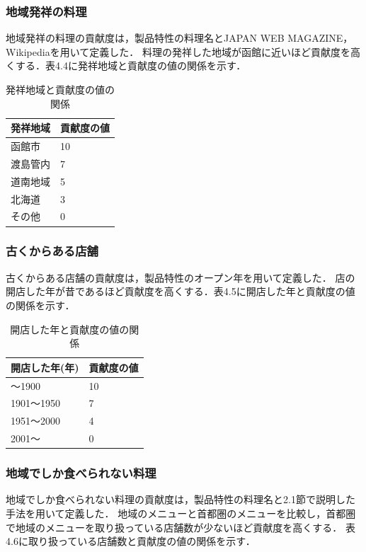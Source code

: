 \documentclass{funthesis}
\begin{document}
\subsubsection{地域発祥の料理}
地域発祥の料理の貢献度は，製品特性の料理名とJAPAN WEB MAGAZINE，Wikipediaを用いて定義した．
料理の発祥した地域が函館に近いほど貢献度を高くする．表4.4に発祥地域と貢献度の値の関係を示す．

\begin{table}[htb]
  \begin{center}
  \scriptsize
    \caption{発祥地域と貢献度の値の関係}
    \normalsize
   \begin{tabular}{p{6cm}|p{6cm}}
    \hline
発祥地域 & 貢献度の値 \\ \hline\hline
      函館市 & 10  \\ \hline
      渡島管内 & 7 \\ \hline
      道南地域 & 5 \\ \hline
      北海道 & 3 \\ \hline
      その他 & 0 \\ \hline
  \end{tabular}
  \end{center}
\end{table}

\subsubsection{古くからある店舗}
古くからある店舗の貢献度は，製品特性のオープン年を用いて定義した．
店の開店した年が昔であるほど貢献度を高くする．表4.5に開店した年と貢献度の値の関係を示す．

\begin{table}[htb]
  \begin{center}
  \scriptsize
    \caption{開店した年と貢献度の値の関係}
    \normalsize
   \begin{tabular}{p{6cm}|p{6cm}}
    \hline
開店した年(年) & 貢献度の値 \\ \hline\hline
      〜1900 & 10  \\ \hline
      1901〜1950 & 7 \\ \hline
      1951〜2000 & 4 \\ \hline
      2001〜 & 0 \\ \hline
  \end{tabular}
  \end{center}
\end{table}

\subsubsection{地域でしか食べられない料理}
地域でしか食べられない料理の貢献度は，製品特性の料理名と2.1節で説明した手法を用いて定義した．
地域のメニューと首都圏のメニューを比較し，首都圏で地域のメニューを取り扱っている店舗数が少ないほど貢献度を高くする．
表4.6に取り扱っている店舗数と貢献度の値の関係を示す．
\end{document}
